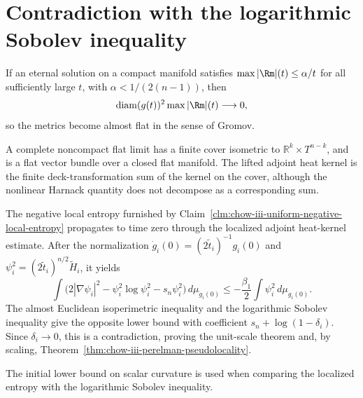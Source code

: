 \section{Contradiction with the logarithmic Sobolev inequality}

\begin{lemma}
\label{lem:chow-iii-type-iii-curvature-gap}
If an eternal solution on a compact manifold satisfies
\(\max|\Rm|(t)\le\alpha/t\) for all sufficiently large \(t\), with
\(\alpha<1/(2(n-1))\), then
\[
\operatorname{diam}(g(t))^2\max|\Rm|(t)\longrightarrow0,
\]
so the metrics become almost flat in the sense of Gromov.
\end{lemma}

\begin{remark}
\label{rem:chow-iii-flat-limit-cover}
A complete noncompact flat limit has a finite cover isometric to
\(\mathbb R^k\times T^{n-k}\), and is a flat vector bundle over a closed flat
manifold.  The lifted adjoint heat kernel is the finite deck-transformation sum
of the kernel on the cover, although the nonlinear Harnack quantity does not
decompose as a corresponding sum.
\end{remark}

\begin{theorem}
\label{thm:chow-iii-pseudolocality-log-sobolev-contradiction}
The negative local entropy furnished by Claim~\ref{clm:chow-iii-uniform-negative-local-entropy}
propagates to time zero through the localized adjoint heat-kernel estimate.  After
the normalization \(\dot g_i(0)=(2\widetilde t_i)^{-1}g_i(0)\) and
\(\psi_i^2=(2\widetilde t_i)^{n/2}\widetilde H_i\), it yields
\[
\int\bigl(2|\nabla\psi_i|^2-\psi_i^2\log\psi_i^2-s_n\psi_i^2\bigr)
\,d\mu_{\dot g_i(0)}\le-\frac{\beta_1}{2}\int\psi_i^2\,d\mu_{\dot g_i(0)}.
\]
The almost Euclidean isoperimetric inequality and the logarithmic Sobolev
inequality give the opposite lower bound with coefficient
\(s_n+\log(1-\delta_i)\).  Since \(\delta_i\to0\), this is a contradiction,
proving the unit-scale theorem and, by scaling, Theorem~\ref{thm:chow-iii-perelman-pseudolocality}.
\end{theorem}

\begin{remark}
\label{rem:chow-iii-pseudolocality-scalar-role}
The initial lower bound on scalar curvature is used when comparing the localized
entropy with the logarithmic Sobolev inequality.
\end{remark}
